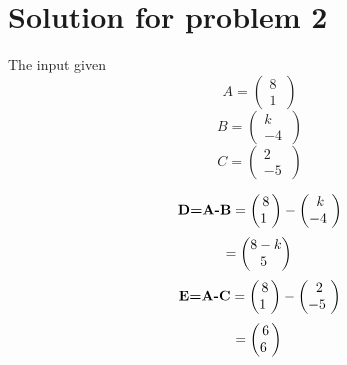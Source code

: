 \documentclass[10pt, a4paper]{article}
\begin{document}
\section{Solution for problem 2}
\begin{center}
The input given 
\boldmath
\begin{equation} \label{eq:}
A=\begin{pmatrix} 8\\ 1\ \end{pmatrix} 
\end{equation}
\begin{equation}\label{eq:}
B=\begin{pmatrix} k\\ -4\ \end{pmatrix}
\end{equation}
\begin{equation}\label{eq:}
C=\begin{pmatrix} 2\\ -5\ \end{pmatrix}
\end{equation}
\unboldmath
\end{center}
\begin{equation}\label{eq:}
\textbf{D=A-B}\\
=\begin{pmatrix} 8\\ 1\ \end{pmatrix}- \begin{pmatrix} k\\ -4\ \end{pmatrix}
\end{equation}
\begin{equation}\label{eq:}
=\begin{pmatrix} 8-k\\ 5\ \end{pmatrix}\\
\end{equation}
\begin{equation}\label{eq:}
\textbf{E=A-C}\\
=\begin{pmatrix} 8\\ 1\ \end{pmatrix}- \begin{pmatrix} 2\\ -5\ \end{pmatrix}
\end{equation}
\begin{equation}\label{eq:}
=\begin{pmatrix} 6\\ 6\ \end{pmatrix}\\
\end{equation}
\end{document}
